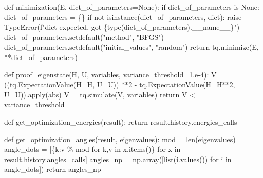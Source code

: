 \documentclass[
  letterpaper,
  DIV=11,
  numbers=noendperiod]{scrartcl}
\newenvironment{Shaded}{\begin{snugshade}}{\end{snugshade}}
\newcommand{\BuiltInTok}[1]{\textcolor[rgb]{0.00,0.23,0.31}{#1}}
\newcommand{\ControlFlowTok}[1]{\textcolor[rgb]{0.00,0.23,0.31}{#1}}
\newcommand{\DecValTok}[1]{\textcolor[rgb]{0.68,0.00,0.00}{#1}}
\newcommand{\FloatTok}[1]{\textcolor[rgb]{0.68,0.00,0.00}{#1}}
\newcommand{\KeywordTok}[1]{\textcolor[rgb]{0.00,0.23,0.31}{#1}}
\newcommand{\NormalTok}[1]{\textcolor[rgb]{0.00,0.23,0.31}{#1}}
\newcommand{\OperatorTok}[1]{\textcolor[rgb]{0.37,0.37,0.37}{#1}}
\newcommand{\PreprocessorTok}[1]{\textcolor[rgb]{0.68,0.00,0.00}{#1}}
\newcommand{\SpecialCharTok}[1]{\textcolor[rgb]{0.37,0.37,0.37}{#1}}
\newcommand{\SpecialStringTok}[1]{\textcolor[rgb]{0.13,0.47,0.30}{#1}}
\newcommand{\StringTok}[1]{\textcolor[rgb]{0.13,0.47,0.30}{#1}}
\newcommand{\VariableTok}[1]{\textcolor[rgb]{0.07,0.07,0.07}{#1}}
\begin{document}
\begin{Shaded}
\begin{Highlighting}[]
    \KeywordTok{def}\NormalTok{ minimization(E, dict\_of\_parameters}\OperatorTok{=}\VariableTok{None}\NormalTok{):}
        \ControlFlowTok{if}\NormalTok{ dict\_of\_parameters }\KeywordTok{is} \VariableTok{None}\NormalTok{:}
\NormalTok{            dict\_of\_parameters }\OperatorTok{=}\NormalTok{ \{\}}
        \ControlFlowTok{if} \KeywordTok{not} \BuiltInTok{isinstance}\NormalTok{(dict\_of\_parameters, }\BuiltInTok{dict}\NormalTok{):}
            \ControlFlowTok{raise} \PreprocessorTok{TypeError}\NormalTok{(}\SpecialStringTok{f"dict expected, got \textquotesingle{}}\SpecialCharTok{\{}\BuiltInTok{type}\NormalTok{(dict\_of\_parameters)}\SpecialCharTok{.}\VariableTok{\_\_name\_\_}\SpecialCharTok{\}}\SpecialStringTok{\textquotesingle{}"}\NormalTok{)}
\NormalTok{        dict\_of\_parameters.setdefault(}\StringTok{"method"}\NormalTok{, }\StringTok{"BFGS"}\NormalTok{)}
\NormalTok{        dict\_of\_parameters.setdefault(}\StringTok{"initial\_values"}\NormalTok{, }\StringTok{"random"}\NormalTok{)}
        \ControlFlowTok{return}\NormalTok{ tq.minimize(E, }\OperatorTok{**}\NormalTok{dict\_of\_parameters)}
    
    
    \KeywordTok{def}\NormalTok{ proof\_eigenstate(H, U, variables, variance\_threshold}\OperatorTok{=}\FloatTok{1.e{-}4}\NormalTok{):}
\NormalTok{        V }\OperatorTok{=}\NormalTok{ ((tq.ExpectationValue(H}\OperatorTok{=}\NormalTok{H, U}\OperatorTok{=}\NormalTok{U))  }\OperatorTok{**}\DecValTok{2} \OperatorTok{{-}}\NormalTok{ tq.ExpectationValue(H}\OperatorTok{=}\NormalTok{H}\OperatorTok{**}\DecValTok{2}\NormalTok{, U}\OperatorTok{=}\NormalTok{U)).}\BuiltInTok{apply}\NormalTok{(}\BuiltInTok{abs}\NormalTok{)}
\NormalTok{        V }\OperatorTok{=}\NormalTok{ tq.simulate(V, variables)}
        \ControlFlowTok{return}\NormalTok{ V }\OperatorTok{\textless{}=}\NormalTok{ variance\_threshold}
    
    \KeywordTok{def}\NormalTok{ get\_optimization\_energies(result):}
        \ControlFlowTok{return}\NormalTok{ result.history.energies\_calls}

    \KeywordTok{def}\NormalTok{ get\_optimization\_angles(result, eigenvalues):}
\NormalTok{        mod }\OperatorTok{=} \BuiltInTok{len}\NormalTok{(eigenvalues)}
\NormalTok{        angle\_dots }\OperatorTok{=}\NormalTok{ [\{k:v }\OperatorTok{\%}\NormalTok{ mod }\ControlFlowTok{for}\NormalTok{ k,v }\KeywordTok{in}\NormalTok{ x.items()\} }\ControlFlowTok{for}\NormalTok{ x }\KeywordTok{in}\NormalTok{ result.history.angles\_calls]}
\NormalTok{        angles\_np }\OperatorTok{=}\NormalTok{ np.array([}\BuiltInTok{list}\NormalTok{(i.values()) }\ControlFlowTok{for}\NormalTok{ i }\KeywordTok{in}\NormalTok{ angle\_dots])}
        \ControlFlowTok{return}\NormalTok{ angles\_np}
    

\end{Highlighting}
\end{Shaded}
\end{document}

